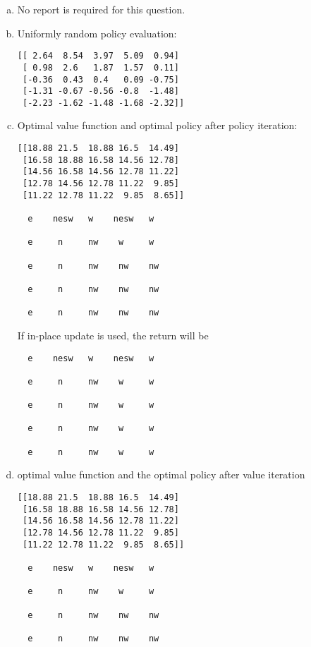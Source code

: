 \begin{enumerate}[(a)]
    \item No report is required for this question.
    \item Uniformly random policy evaluation:
    \begin{verbatim}
[[ 2.64  8.54  3.97  5.09  0.94]
 [ 0.98  2.6   1.87  1.57  0.11]
 [-0.36  0.43  0.4   0.09 -0.75]
 [-1.31 -0.67 -0.56 -0.8  -1.48]
 [-2.23 -1.62 -1.48 -1.68 -2.32]]
    \end{verbatim}
    \item Optimal value function and optimal policy after policy iteration:
    \begin{verbatim}
[[18.88 21.5  18.88 16.5  14.49]
 [16.58 18.88 16.58 14.56 12.78]
 [14.56 16.58 14.56 12.78 11.22]
 [12.78 14.56 12.78 11.22  9.85]
 [11.22 12.78 11.22  9.85  8.65]]

  e    nesw   w    nesw   w

  e     n     nw    w     w

  e     n     nw    nw    nw

  e     n     nw    nw    nw

  e     n     nw    nw    nw
  \end{verbatim}
If in-place update is used, the return will be
  \begin{verbatim}
  e    nesw   w    nesw   w

  e     n     nw    w     w

  e     n     nw    w     w

  e     n     nw    w     w

  e     n     nw    w     w
    \end{verbatim}
    \item optimal value function and the optimal policy after value iteration
    \begin{verbatim}
[[18.88 21.5  18.88 16.5  14.49]
 [16.58 18.88 16.58 14.56 12.78]
 [14.56 16.58 14.56 12.78 11.22]
 [12.78 14.56 12.78 11.22  9.85]
 [11.22 12.78 11.22  9.85  8.65]]

  e    nesw   w    nesw   w

  e     n     nw    w     w

  e     n     nw    nw    nw

  e     n     nw    nw    nw


\end{verbatim}
\end{enumerate}

